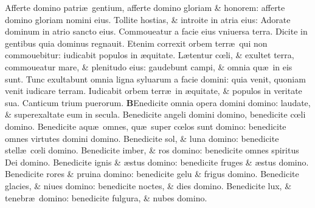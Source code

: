 \documentclass[a5paper,10pt]{book}
\def\ae{æ}
\def\oe{œ}
\begin{document}
\begin{multicols*}{2}
\newline \color{red} A\color{black}fferte domino patri\ae \ gentium, afferte domino gloriam \& honorem: afferte domino gloriam nomini eius.
\newline \color{red} T\color{black}ollite hostias, \& introite in atria eius: Adorate dominum in atrio sancto eius.
\newline \color{red} C\color{black}ommoueatur a facie eius vniuersa terra. Dicite in gentibus quia dominus regnauit.
\newline \color{red} E\color{black}tenim correxit orbem terr\ae \ qui non commouebitur: iudicabit populos in \ae quitate.
\newline \color{red} L\color{black}\ae tentur c\oe li, \& exultet terra, commoueatur mare, \& plenitudo eius: gaudebunt campi, \& omnia qu\ae \ in eis sunt.
\newline \color{red} T\color{black}unc exultabunt omnia ligna syluarum a facie domini: quia venit, quoniam venit iudicare terram.
\newline \color{red} I\color{black}udicabit orbem terr\ae \ in \ae quitate, \& populos in veritate sua.
\newline \color{red} \hypertarget{benedicite}{Canticum} trium puerorum. \color{black}
\vspace{-1em}
\lettrine[lines=2]{\bfseries \color{red} B}{}Enedicite omnia opera domini domino: laudate, \& superexaltate eum in secula.
\newline \color{red} B\color{black}enedicite angeli domini domino, benedicite c\oe li domino.
\newline \color{red} B\color{black}enedicite aqu\ae \ omnes, qu\ae \ super c\oe los sunt domino: benedicite omnes virtutes domini domino.
\newline \color{red} B\color{black}enedicite sol, \& luna domino: benedicite stell\ae \ c\oe li domino.
\newline \color{red} B\color{black}enedicite imber, \& ros domino: benedicite omnes spiritus Dei domino.
\newline \color{red} B\color{black}enedicite ignis \& \ae stus domino: benedicite fruges \& \ae stus domino.
\newline \color{red} B\color{black}enedicite rores \& pruina domino: benedicite gelu \& frigus domino.
\newline \color{red} B\color{black}enedicite glacies, \& niues domino: benedicite noctes, \& dies domino.
\newline \color{red} B\color{black}enedicite lux, \& tenebr\ae \ domino: benedicite fulgura, \& nubes domino.

\end{multicols*}
\end{document}

